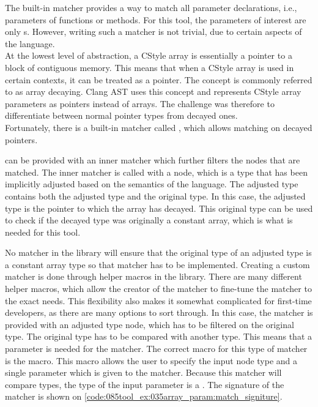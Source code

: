 The built-in matcher  provides a way to match all parameter declarations, i.e., parameters of functions or methods. For this tool, the parameters of interest are only s. However, writing such a matcher is not trivial, due to certain aspects of the language.\\
At the lowest level of abstraction, a CStyle array is essentially a pointer to a block of contiguous memory.
This means that when a CStyle array is used in certain contexts, it can be treated as a pointer. The concept is commonly referred to as array decaying.
Clang AST uses this concept and represents CStyle array parameters as pointers instead of arrays.
The challenge was therefore to differentiate between normal pointer types from decayed ones.\\
Fortunately, there is a built-in matcher called , which allows matching on decayed pointers.

 can be provided with an inner matcher which further filters the nodes that are matched. The inner matcher is called with a  node, which is a type that has been implicitly adjusted based on the semantics of the language. The adjusted type contains both the adjusted type and the original type. In this case, the adjusted type is the pointer to which the array has decayed. This original type can be used to check if the decayed type was originally a constant array, which is what is needed for this tool. 

No matcher in the library will ensure that the original type of an adjusted type is a constant array type so that matcher has to be implemented. Creating a custom matcher is done through helper macros in the library. There are many different helper macros, which allow the creator of the matcher to fine-tune the matcher to the exact needs. This flexibility also makes it somewhat complicated for first-time developers, as there are many options to sort through. In this case, the matcher is provided with an adjusted type node, which has to be filtered on the original type. The original type has to be compared with another type. This means that a parameter is needed for the matcher. The correct macro for this type of matcher is the  macro. This macro allows the user to specify the input node type and a single parameter which is given to the matcher. Because this matcher will compare types, the type of the input parameter is a . The signature of the matcher is shown on \cref{code:085tool_ex:035array_param:match_signiture}.

